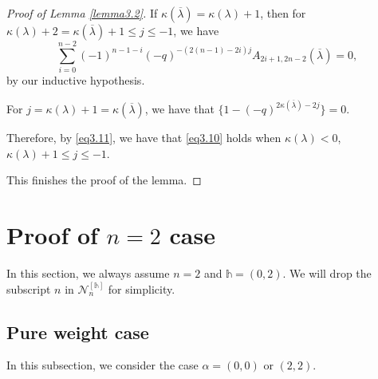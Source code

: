 \documentclass[11pt,oneside]{amsart}
\theoremstyle{plain}
\theoremstyle{definition}
\theoremstyle{remark}
\newcommand{\cN}{\mathcal{N}}
\numberwithin{equation}{section}
\begin{document}
\begin{proof}[Proof of Lemma \ref{lemma3.2}]
		If $\kappa(\overline{\lambda})=\kappa(\lambda)+1$, then for $\kappa(\lambda)+2=\kappa(\overline{\lambda})+1 \leq j \leq -1$, we have
		\begin{equation*}
			\sum_{i=0}^{n-2}(-1)^{n-1-i}(-q)^{-(2(n-1)-2i)j}A_{2i+1,2n-2}(\overline{\lambda})=0,
		\end{equation*}
		by our inductive hypothesis.
		
		For $j=\kappa(\lambda)+1=\kappa(\overline{\lambda})$, we have that  $\lbrace 1-(-q)^{2\kappa(\overline{\lambda})-2j}\rbrace=0$.
		
		Therefore, by \eqref{eq3.11}, we have that \eqref{eq3.10} holds when $\kappa(\lambda)<0$, $\kappa(\lambda)+1 \leq j \leq -1$.
		
		This finishes the proof of the lemma.
	\end{proof}
	
	

    	
	\section{Proof of $n=2$ case}\label{section5}
		In this section, we always assume $n=2$ and $\mathds{h}=(0,2)$. We will drop the subscript $n$ in $\cN_n^{[\mathds{h}]}$ for simplicity.
        
        
\subsection{Pure weight case}
In this subsection, we consider the case  $\alpha=(0,0)$ or $(2,2)$.
\end{document}
